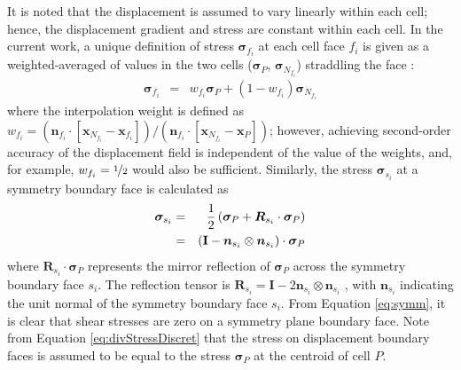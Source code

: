 \documentclass[sn-mathphys,Numbered]{sn-jnl}%
\newcommand{\bb}{\boldsymbol}
\begin{document}
It is noted that the displacement is assumed to vary linearly within each cell; hence, the displacement gradient and stress are constant within each cell.
In the current work, a unique definition of stress $\bb{\sigma}_{f_i}$ at each cell face $f_i$ is given as a weighted-averaged of values in the two cells ($\bb{\sigma}_P $, $\bb{\sigma}_{N_{f_i}}$) straddling the face \citep{Jasak1996}:
\begin{eqnarray} \label{eq:stressInterp}
	\bb{\sigma}_{f_i} &=& w_{f_i} \bb{\sigma}_P + (1 - w_{f_i}) \bb{\sigma}_{N_{f_i}}
\end{eqnarray}
where the interpolation weight is defined as $w_{f_i} = (\bb{n}_{f_i} \cdot [\bb{x}_{N_{f_i}} - \bb{x}_{f_i}])/(\bb{n}_{f_i} \cdot [\bb{x}_{N_{f_i}} - \bb{x}_{P} ])$; however, achieving second-order accuracy of the displacement field is independent of the value of the weights, and, for example, $w_{f_i} = \nicefrac{1}{2}$ would also be sufficient.
Similarly, the stress $\bb{\sigma}_{s_i}$ at a symmetry boundary face is calculated as
\begin{eqnarray} \label{eq:symm}
	\bb{\sigma}_{s_i}
		&=& \frac{1}{2} \left (\bb{\sigma}_P + \bb{R}_{s_i} \cdot \bb{\sigma}_{P} \right) \notag \\
		&=& \left (\textbf{I} - \bb{n}_{s_i} \otimes \bb{n}_{s_i} \right) \cdot \bb{\sigma}_P
\end{eqnarray}
where $\bb{R}_{s_i} \cdot \bb{\sigma}_{P}$ represents the mirror reflection of $\bb{\sigma}_P$ across the symmetry boundary face $s_i$.
The reflection tensor is $\bb{R}_{s_i} = \textbf{I} - 2 \bb{n}_{s_i} \otimes \bb{n}_{s_i}$ \citep{Demirdzic2022}, with $\bb{n}_{s_i}$ indicating the unit normal of the symmetry boundary face $s_i$.
From Equation \ref{eq:symm}, it is clear that shear stresses are zero on a symmetry plane boundary face.
Note from Equation \ref{eq:divStressDiscret} that the stress on displacement boundary faces is assumed to be equal to the stress $\bb{\sigma}_P$ at the centroid of cell $P$.
\end{document}
